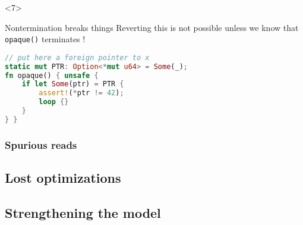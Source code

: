 \begin{frame}[fragile, t]
\begin{onlyenv}
\begin{block}{}
        \end{block}
    \end{onlyenv}

    \begin{onlyenv}<7>
        \begin{block}{Nontermination breaks things}
            \footnotesize Reverting this is not possible unless we know that \texttt{opaque()} terminates !
            \begin{lstlisting}[language=rust, basicstyle=\ttfamily\scriptsize]
// put here a foreign pointer to x
static mut PTR: Option<*mut u64> = Some(_);
fn opaque() { unsafe {
    if let Some(ptr) = PTR {
        assert!(*ptr != 42);
        loop {}
    }
} }
            \end{lstlisting}
        \end{block}
    \end{onlyenv}
\end{frame}

\begin{frame}
    \frametitle{Spurious reads}

\end{frame}

\subsection{Lost optimizations}


\begin{frame}
    \frametitle{}
\end{frame}

\subsection{Strengthening the model}


\begin{frame}
    \frametitle{}
\end{frame}


\begin{frame}
    \frametitle{}
\end{frame}
